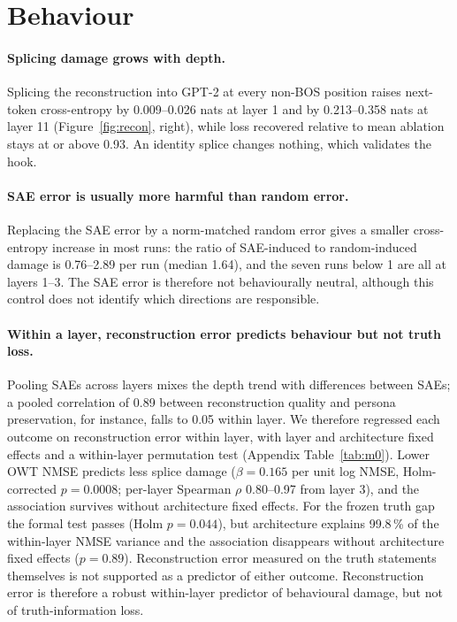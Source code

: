 \section{Behaviour}\label{sec:behaviour}

\paragraph{Splicing damage grows with depth.} Splicing the reconstruction into GPT-2 at every non-BOS position raises
next-token cross-entropy by 0.009--0.026 nats at layer 1 and by 0.213--0.358 nats at layer 11
(Figure~\ref{fig:recon}, right), while loss recovered relative to mean ablation stays at or above 0.93. An identity
splice changes nothing, which validates the hook.

\paragraph{SAE error is usually more harmful than random error.} Replacing the SAE error by a norm-matched random error
gives a smaller cross-entropy increase in most runs: the ratio of SAE-induced to random-induced damage is 0.76--2.89
per run (median 1.64), and the seven runs below 1 are all at layers 1--3. The SAE error is therefore not behaviourally
neutral, although this control does not identify which directions are responsible.

\paragraph{Within a layer, reconstruction error predicts behaviour but not truth loss.} Pooling SAEs across layers
mixes the depth trend with differences between SAEs; a pooled correlation of 0.89 between reconstruction quality and
persona preservation, for instance, falls to 0.05 within layer. We therefore regressed each outcome on reconstruction
error within layer, with layer and architecture fixed effects and a within-layer permutation test (Appendix
Table~\ref{tab:m0}). Lower OWT NMSE predicts less splice damage ($\beta=0.165$ per unit log NMSE, Holm-corrected
$p=0.0008$; per-layer Spearman $\rho$ 0.80--0.97 from layer 3), and the association survives without architecture
fixed effects. For the frozen truth gap the formal test passes (Holm $p=0.044$), but architecture explains 99.8\,\% of
the within-layer NMSE variance and the association disappears without architecture fixed effects ($p=0.89$).
Reconstruction error measured on the truth statements themselves is not supported as a predictor of either outcome.
Reconstruction error is therefore a robust within-layer predictor of behavioural damage, but not of truth-information
loss.
